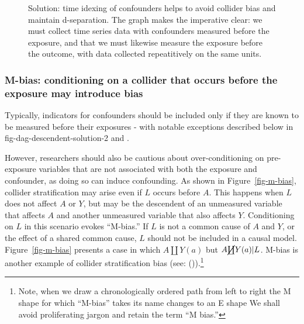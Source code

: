 \documentclass[
  singlecolumn]{article}
\begin{document}
\begin{figure}


\caption{\label{fig-dag-common-effect-solution}Solution: time idexing of
confounders helps to avoid collider bias and maintain d-separation. The
graph makes the imperative clear: we must collect time series data with
confounders measured before the exposure, and that we must likewise
measure the exposure before the outcome, with data collected
repeatitively on the same units.}

\end{figure}%

\subsubsection{M-bias: conditioning on a collider that occurs before the
exposure may introduce
bias}\label{m-bias-conditioning-on-a-collider-that-occurs-before-the-exposure-may-introduce-bias}

Typically, indicators for confounders should be included only if they
are known to be measured before their exposures - with notable
exceptions described below in fig-dag-descendent-solution-2 and .

However, researchers should also be cautious about over-conditioning on
pre-exposure variables that are not associated with both the exposure
and confounder, as doing so can induce confounding. As shown in
Figure~\ref{fig-m-bias}, collider stratification may arise even if \(L\)
occurs before \(A\). This happens when \(L\) does not affect \(A\) or
\(Y\), but may be the descendent of an unmeasured variable that affects
\(A\) and another unmeasured variable that also affects \(Y\).
Conditioning on \(L\) in this scenario evokes ``M-bias.'' If \(L\) is
not a common cause of \(A\) and \(Y\), or the effect of a shared common
cause, \(L\) should not be included in a causal model.
Figure~\ref{fig-m-bias} presents a case in which \(A \coprod Y(a)\) but
\(A \cancel{\coprod} Y(a)| L\). M-bias is another example of collider
stratification bias (see: ()).\footnote{Note, when we draw a chronologically ordered path from
  left to right the M shape for which ``M-bias'' takes its name changes
  to an E shape We shall avoid proliferating jargon and retain the term
  ``M bias.''}
\end{document}

